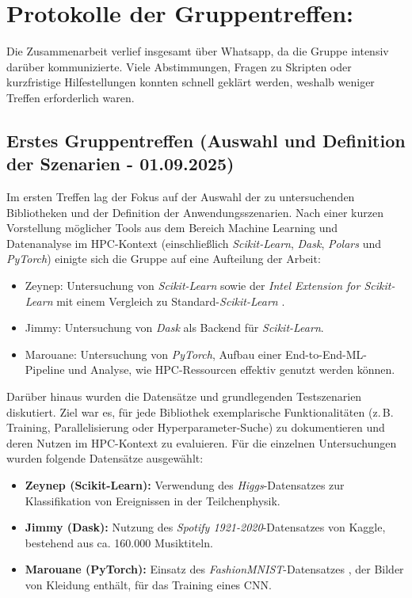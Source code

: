 \documentclass{article}
\begin{document}
\newpage
\section{Protokolle der Gruppentreffen:}
\label{sec:pro1}
Die Zusammenarbeit verlief insgesamt über Whatsapp, da die Gruppe intensiv darüber kommunizierte. 
Viele Abstimmungen, Fragen zu Skripten oder kurzfristige Hilfestellungen konnten schnell geklärt werden, 
weshalb weniger Treffen erforderlich waren. 

\subsection*{Erstes Gruppentreffen (Auswahl und Definition der Szenarien - 01.09.2025)}
Im ersten Treffen lag der Fokus auf der Auswahl der zu untersuchenden Bibliotheken und der Definition der Anwendungsszenarien. 
Nach einer kurzen Vorstellung möglicher Tools aus dem Bereich Machine Learning und Datenanalyse im HPC-Kontext 
(einschließlich \textit{Scikit-Learn}, \textit{Dask}, \textit{Polars} und \textit{PyTorch}) einigte sich die Gruppe auf eine Aufteilung der Arbeit:
\begin{itemize}
    \item Zeynep: Untersuchung von \textit{Scikit-Learn} sowie der \textit{Intel Extension for Scikit-Learn} \parencite{sklearn_intelex} mit einem Vergleich zu Standard-\textit{Scikit-Learn} \parencite{scikit-learn}.
    \item Jimmy: Untersuchung von \textit{Dask} als Backend für \textit{Scikit-Learn}.
    \item Marouane: Untersuchung von \textit{PyTorch}, Aufbau einer End-to-End-ML-Pipeline und Analyse, wie HPC-Ressourcen effektiv genutzt werden können.
\end{itemize}
Darüber hinaus wurden die Datensätze und grundlegenden Testszenarien diskutiert. Ziel war es, für jede Bibliothek exemplarische Funktionalitäten 
(z.\,B. Training, Parallelisierung oder Hyperparameter-Suche) zu dokumentieren und deren Nutzen im HPC-Kontext zu evaluieren. 
Für die einzelnen Untersuchungen wurden folgende Datensätze ausgewählt:
\begin{itemize}
    \item \textbf{Zeynep (Scikit-Learn):} Verwendung des \textit{Higgs}-Datensatzes \parencite{higgs_280} zur Klassifikation von Ereignissen in der Teilchenphysik. 
    
    \item \textbf{Jimmy (Dask):} Nutzung des \textit{Spotify 1921-2020}-Datensatzes \parencite{SpotifyDataset} von Kaggle, bestehend aus ca. 160.000 Musiktiteln. 
    
    \item \textbf{Marouane (PyTorch):} Einsatz des \textit{FashionMNIST}-Datensatzes \parencite{xiao2017fashion}, der Bilder von Kleidung enthält, für das Training eines CNN.
\end{itemize}
\end{document}

